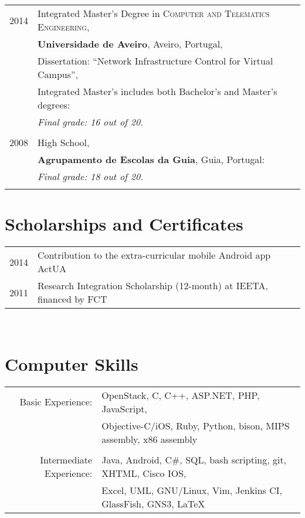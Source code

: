 \documentclass[a4paper,10pt]{article} %
\begin{document}
\begin{tabular}{rl}	
\textsc{2014} & Integrated Master's Degree in \textsc{Computer and Telematics Engineering}, \\
&\textbf{Universidade de Aveiro}, Aveiro, Portugal, \\
& Dissertation: ``Network Infrastructure Control for Virtual Campus'', \\
& Integrated Master's includes both Bachelor's and Master's degrees: \\
& \textit{Final grade: 16 out of 20.}\\
&\\


\textsc{2008} & High School, \\
&\textbf{Agrupamento de Escolas da Guia}, Guia, Portugal: \\
& \textit{Final grade: 18 out of 20.}\\
&\\


\end{tabular}


\section{Scholarships and Certificates}

\begin{tabular}{rl}
\textsc{2014} & Contribution to the extra-curricular mobile Android app ActUA \normalsize\\
\textsc{2011} & Research Integration Scholarship (12-month) at IEETA, financed by FCT \normalsize\\
\end{tabular} \\


\section{Computer Skills}

\begin{tabular}{rl}
Basic Experience: & OpenStack, C, C++, ASP.NET, PHP, JavaScript,\\
& Objective-C/iOS, Ruby, Python, bison, MIPS assembly, x86 assembly\\
& \\

Intermediate Experience: & Java, Android, C\#, SQL, bash scripting, git, XHTML, Cisco IOS,\\
& Excel, UML, GNU/Linux, Vim, Jenkins CI, GlassFish, GNS3, {\LaTeX}\\
\end{tabular} \\
\end{document}
